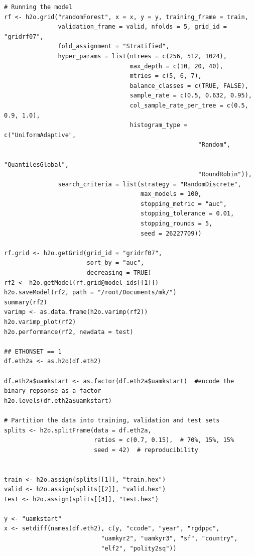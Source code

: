 \documentclass[a4paper,12pt]{article}
\begin{document}
\begin{verbatim}
# Running the model
rf <- h2o.grid("randomForest", x = x, y = y, training_frame = train, 
               validation_frame = valid, nfolds = 5, grid_id = "gridrf07",
               fold_assignment = "Stratified",
               hyper_params = list(ntrees = c(256, 512, 1024),
                                   max_depth = c(10, 20, 40),
                                   mtries = c(5, 6, 7),
                                   balance_classes = c(TRUE, FALSE),
                                   sample_rate = c(0.5, 0.632, 0.95),
                                   col_sample_rate_per_tree = c(0.5, 0.9, 1.0),
                                   histogram_type = c("UniformAdaptive",
                                                      "Random",
                                                      "QuantilesGlobal",
                                                      "RoundRobin")),
               search_criteria = list(strategy = "RandomDiscrete", 
                                      max_models = 100, 
                                      stopping_metric = "auc", 
                                      stopping_tolerance = 0.01, 
                                      stopping_rounds = 5, 
                                      seed = 26227709)) 

rf.grid <- h2o.getGrid(grid_id = "gridrf07",
                       sort_by = "auc",
                       decreasing = TRUE)
rf2 <- h2o.getModel(rf.grid@model_ids[[1]])
h2o.saveModel(rf2, path = "/root/Documents/mk/")
summary(rf2)
varimp <- as.data.frame(h2o.varimp(rf2))
h2o.varimp_plot(rf2)
h2o.performance(rf2, newdata = test)

## ETHONSET == 1
df.eth2a <- as.h2o(df.eth2)

df.eth2a$uamkstart <- as.factor(df.eth2a$uamkstart)  #encode the binary repsonse as a factor
h2o.levels(df.eth2a$uamkstart)

# Partition the data into training, validation and test sets
splits <- h2o.splitFrame(data = df.eth2a, 
                         ratios = c(0.7, 0.15),  # 70%, 15%, 15%
                         seed = 42)  # reproducibility


train <- h2o.assign(splits[[1]], "train.hex")   
valid <- h2o.assign(splits[[2]], "valid.hex") 
test <- h2o.assign(splits[[3]], "test.hex")

y <- "uamkstart"
x <- setdiff(names(df.eth2), c(y, "ccode", "year", "rgdppc",
                           "uamkyr2", "uamkyr3", "sf", "country",
                           "elf2", "polity2sq")) 


\end{verbatim}
\end{document}
